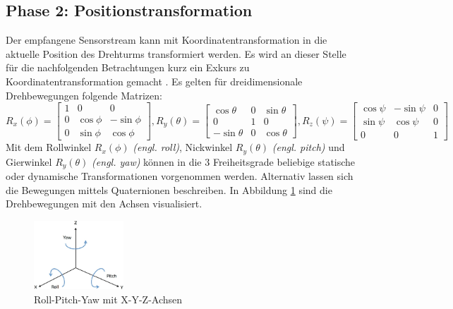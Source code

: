 \subsection{Phase 2: Positionstransformation}
\label{subsec:Phase}

Der empfangene Sensorstream kann mit Koordinatentransformation in die aktuelle Position des Drehturms transformiert werden. Es wird an dieser Stelle für die nachfolgenden Betrachtungen kurz ein Exkurs zu Koordinatentransformation gemacht \cite{Koordinaten}.
Es gelten für dreidimensionale Drehbewegungen folgende Matrizen:\\

$R_x(\phi ) =\begin{bmatrix}
	1&  0& 0\\ 
	0&  \cos\phi&  -\sin\phi\\ 
	0&  \sin\phi&  \cos\phi
\end{bmatrix}, R_y(\theta ) = \begin{bmatrix}
	\cos\theta&  0& \sin\theta \\ 
	0&  1& 0\\ 
	-\sin\theta &  0& \cos\theta 
\end{bmatrix}, R_z(\psi ) =\begin{bmatrix}
	\cos\psi& -\sin\psi  & 0 \\ 
	\sin\psi&  \cos\psi& 0 \\ 
	0&  0& 1
\end{bmatrix}$\\

Mit dem Rollwinkel $R_x(\phi)$ \textit{(engl. roll)}, Nickwinkel $R_y(\theta )$ \textit{(engl. pitch)} und Gierwinkel $R_y(\theta )$ \textit{(engl. yaw)} können in die 3 Freiheitsgrade beliebige statische oder dynamische Transformationen vorgenommen werden. Alternativ lassen sich die Bewegungen mittels \ac{Quaternionen} beschreiben. In Abbildung \ref{fig:rollpitchyaw} sind die Drehbewegungen mit den Achsen visualisiert.

\begin{figure}[H]
		\centering
	\includegraphics[width=0.3\textwidth]{resources/rollpitchyaw.png}
	\caption[{Roll-Pitch-Yaw mit X-Y-Z-Achsen}]{Roll-Pitch-Yaw mit X-Y-Z-Achsen}
	\label{fig:rollpitchyaw}
\end{figure} 


